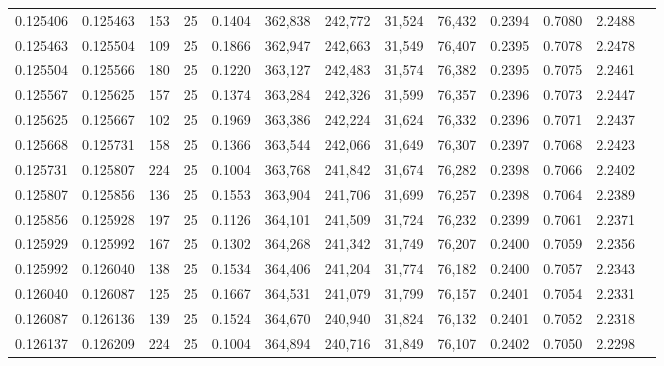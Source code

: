 \begin{tabular}{rrrrrrrrrrrrr}
0.125406 & 0.125463 &   153 &  25 &                                     0.1404 & 362,838 & 242,772 &  31,524 &  76,432 & 0.2394 & 0.7080 & 2.2488 \\
0.125463 & 0.125504 &   109 &  25 &                                     0.1866 & 362,947 & 242,663 &  31,549 &  76,407 & 0.2395 & 0.7078 & 2.2478 \\
0.125504 & 0.125566 &   180 &  25 &                                     0.1220 & 363,127 & 242,483 &  31,574 &  76,382 & 0.2395 & 0.7075 & 2.2461 \\
0.125567 & 0.125625 &   157 &  25 &                                     0.1374 & 363,284 & 242,326 &  31,599 &  76,357 & 0.2396 & 0.7073 & 2.2447 \\
0.125625 & 0.125667 &   102 &  25 &                                     0.1969 & 363,386 & 242,224 &  31,624 &  76,332 & 0.2396 & 0.7071 & 2.2437 \\
0.125668 & 0.125731 &   158 &  25 &                                     0.1366 & 363,544 & 242,066 &  31,649 &  76,307 & 0.2397 & 0.7068 & 2.2423 \\
0.125731 & 0.125807 &   224 &  25 &                                     0.1004 & 363,768 & 241,842 &  31,674 &  76,282 & 0.2398 & 0.7066 & 2.2402 \\
0.125807 & 0.125856 &   136 &  25 &                                     0.1553 & 363,904 & 241,706 &  31,699 &  76,257 & 0.2398 & 0.7064 & 2.2389 \\
0.125856 & 0.125928 &   197 &  25 &                                     0.1126 & 364,101 & 241,509 &  31,724 &  76,232 & 0.2399 & 0.7061 & 2.2371 \\
0.125929 & 0.125992 &   167 &  25 &                                     0.1302 & 364,268 & 241,342 &  31,749 &  76,207 & 0.2400 & 0.7059 & 2.2356 \\
0.125992 & 0.126040 &   138 &  25 &                                     0.1534 & 364,406 & 241,204 &  31,774 &  76,182 & 0.2400 & 0.7057 & 2.2343 \\
0.126040 & 0.126087 &   125 &  25 &                                     0.1667 & 364,531 & 241,079 &  31,799 &  76,157 & 0.2401 & 0.7054 & 2.2331 \\
0.126087 & 0.126136 &   139 &  25 &                                     0.1524 & 364,670 & 240,940 &  31,824 &  76,132 & 0.2401 & 0.7052 & 2.2318 \\
0.126137 & 0.126209 &   224 &  25 &                                     0.1004 & 364,894 & 240,716 &  31,849 &  76,107 & 0.2402 & 0.7050 & 2.2298 \\

\end{tabular}
